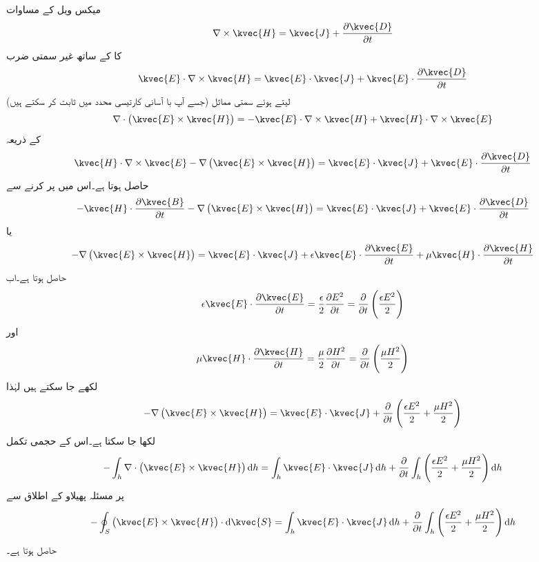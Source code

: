 میکس ویل کے مساوات 
\begin{align*}
\nabla \times \kvec{H}=\kvec{J}+\frac{\partial \kvec{D}}{\partial t}
\end{align*}
کا  کے ساتھ غیر سمتی ضرب
\begin{align*}
\kvec{E} \cdot \nabla \times \kvec{H}=\kvec{E} \cdot \kvec{J}+\kvec{E} \cdot \frac{\partial \kvec{D}}{\partial t}
\end{align*}
لیتے ہوئے سمتی مماثل (جسے آپ با آسانی کارتیسی محدد میں ثابت کر سکتے ہیں)
\begin{align*}
\nabla \cdot \left(\kvec{E} \times \kvec{H} \right)=-\kvec{E} \cdot \nabla \times \kvec{H}+\kvec{H} \cdot \nabla \times \kvec{E}
\end{align*}
کے ذریعہ
\begin{align*}
\kvec{H} \cdot \nabla \times \kvec{E}-\nabla \left(\kvec{E} \times \kvec{H}\right)=\kvec{E} \cdot \kvec{J}+\kvec{E} \cdot \frac{\partial \kvec{D}}{\partial t}
\end{align*}
حاصل ہوتا ہے۔اس میں  پر کرنے سے
\begin{align*}
-\kvec{H} \cdot \frac{\partial \kvec{B}}{\partial t}-\nabla \left(\kvec{E} \times \kvec{H}\right)=\kvec{E} \cdot \kvec{J}+\kvec{E} \cdot \frac{\partial \kvec{D}}{\partial t}
\end{align*}
یا
\begin{align*}
-\nabla \left(\kvec{E} \times \kvec{H}\right)=\kvec{E} \cdot \kvec{J}+\epsilon \kvec{E} \cdot \frac{\partial \kvec{E}}{\partial t}+\mu \kvec{H} \cdot \frac{\partial \kvec{H}}{\partial t}
\end{align*}
حاصل ہوتا ہے۔اب
\begin{align*}
\epsilon \kvec{E} \cdot \frac{\partial \kvec{E}}{\partial t}=\frac{\epsilon}{2}\frac{\partial E^2}{\partial t}=\frac{\partial}{\partial t} \left(\frac{\epsilon E^2}{2} \right)
\end{align*}
اور
\begin{align*}
\mu \kvec{H} \cdot \frac{\partial \kvec{H}}{\partial t}=\frac{\mu}{2}\frac{\partial H^2}{\partial t}=\frac{\partial}{\partial t} \left(\frac{\mu H^2}{2} \right)
\end{align*}
لکھے جا سکتے ہیں لہٰذا
\begin{align*}
-\nabla \left(\kvec{E} \times \kvec{H}\right)=\kvec{E} \cdot \kvec{J}+\frac{\partial}{\partial t} \left(\frac{\epsilon E^2}{2} + \frac{\mu H^2}{2} \right)
\end{align*}
لکھا جا سکتا ہے۔اس کے حجمی تکمل
\begin{align*}
-\int_h \nabla \cdot \left(\kvec{E}\times \kvec{H} \right) \dif h=\int_h \kvec{E} \cdot \kvec{J} \dif h+\frac{\partial}{\partial t}\int_h \left(\frac{\epsilon E^2}{2} + \frac{\mu H^2}{2}  \right) \dif h
\end{align*}
پر مسئلہ پھیلاو کے اطلاق سے
\begin{align}
-\oint_S \left(\kvec{E}\times \kvec{H} \right) \cdot \dif \kvec{S}=\int_h \kvec{E} \cdot \kvec{J} \dif h+\frac{\partial}{\partial t}\int_h \left(\frac{\epsilon E^2}{2} + \frac{\mu H^2}{2}  \right) \dif h
\end{align}
حاصل ہوتا ہے۔


